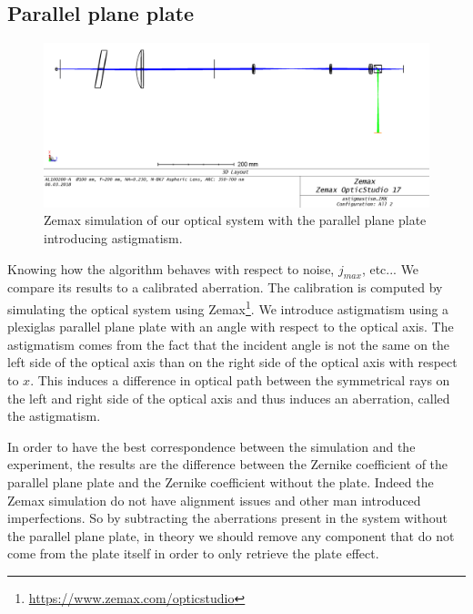 \newpage
\subsection{Parallel plane plate}
\label{subsec:ParPlanePlate}

\begin{figure}
\begin{center}
\includegraphics[width=\textwidth,angle=0]{Figures/parallelPlanePlateWithBS.png}
\decoRule
\caption{Zemax simulation of our optical system with the parallel plane plate introducing astigmatism.}
\label{fig:parallelPlanePlate}
\end{center}
\end{figure}


Knowing how the algorithm behaves with respect to noise, $j_{max}$, etc... We compare its results to a calibrated aberration. The calibration is computed by simulating the optical system using Zemax\footnote{\url{https://www.zemax.com/opticstudio}}. We introduce astigmatism using a plexiglas parallel plane plate with an angle with respect to the optical axis. The astigmatism comes from the fact that the incident angle is not the same on the left side of the optical axis than on the right side of the optical axis with respect to $x$. This induces a difference in optical path between the symmetrical rays on the left and right side of the optical axis and thus induces an aberration, called the astigmatism.

In order to have the best correspondence between the simulation and the experiment, the results are the difference between the Zernike coefficient of the parallel plane plate and the Zernike coefficient without the plate. Indeed the Zemax simulation do not have alignment issues and other man introduced imperfections. So by subtracting the aberrations present in the system without the parallel plane plate, in theory we should remove any component that do not come from the plate itself in order to only retrieve the plate effect.

